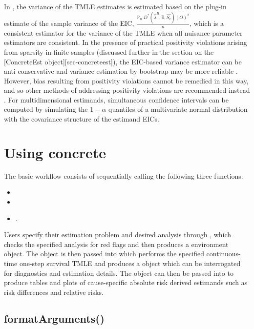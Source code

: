 In , the variance of the TMLE estimates is estimated based on the plug-in estimate of the sample variance of the EIC, \(\frac{\mathbb{P}_n \;D^*( \hat{\lambda}^B, \hat{{\pi}}, \hat{S_c})(O)^2}{n}\), which is a consistent estimator for the variance of the TMLE when all nuisance parameter estimators are consistent. In the presence of practical positivity violations arising from sparsity in finite samples (discussed further in the section on the {[}ConcreteEst object{]}{[}sec-concreteest{]}), the EIC-based variance estimator can be anti-conservative and variance estimation by bootstrap may be more reliable \citep{tran_robust_2018}. However, bias resulting from positivity violations cannot be remedied in this way, and so other methods of addressing positivity violations are recommended instead \citep{petersen_diagnosing_2012}. For multidimensional estimands, simultaneous confidence intervals can be computed by simulating the \(1 - \alpha\) quantiles of a multivariate normal distribution with the covariance structure of the estimand EICs.

\hypertarget{sec-using-concrete}{%
\section{Using concrete}\label{sec-using-concrete}}

The basic  workflow consists of sequentially calling the following three functions:

\begin{itemize}
\item {}
\item {}
\item {}.
\end{itemize}

Users specify their estimation problem and desired analysis through , which checks the specified analysis for red flags and then produces a  environment object. The  object is then passed into  which performs the specified continuous-time one-step survival TMLE and produces a  object which can be interrogated for diagnostics and estimation details. The  object can then be passed into  to produce tables and plots of cause-specific absolute risk derived estimands such as risk differences and relative risks.

\hypertarget{sec-formatArguments}{%
\subsection{formatArguments()}\label{sec-formatArguments}}

